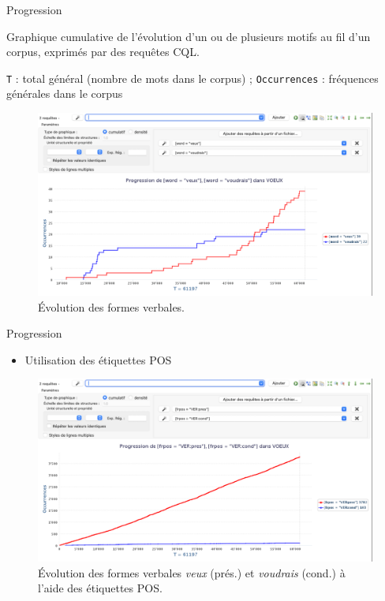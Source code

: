 \documentclass[xetex,xcolor={table,usenames,dvipsnames}]{beamer}
\begin{document}
\begin{frame}{Progression}
		\begin{block}{\vspace{-6mm}}
		\justifying
 Graphique cumulative de l'évolution d'un ou de plusieurs motifs au fil d'un corpus, exprimés par des requêtes \textsc{CQL}.
 \end{block}
 
{\tiny \texttt{T} : total général (nombre de mots dans le corpus) ;	 \texttt{Occurrences} : fréquences générales dans le corpus}

	\begin{figure}[h] %
		\centering
		\includegraphics[width=.7\linewidth]{img/progression.png}
		\caption{Évolution des formes verbales.}
		\label{fig:ling_out_TAL}
	\end{figure}
\end{frame}



\begin{frame}{Progression}
	\begin{itemize}
		\item Utilisation des étiquettes \textsc{POS}
	\end{itemize}
	\begin{figure}[h] %
		\centering
		\includegraphics[width=.9\linewidth]{img/ver_cond_pres.png}
		\caption{Évolution des formes verbales \textit{veux} (prés.) et \textit{voudrais} (cond.) à l'aide des étiquettes \textsc{POS}.}
		\label{fig:ling_out_TAL}
	\end{figure}
\end{frame}
\end{document}
